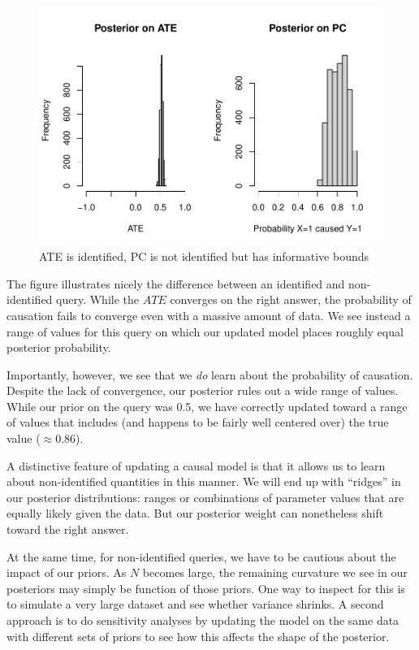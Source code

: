 \documentclass[
  12pt,
]{book}
\begin{document}
\begin{figure}

{\centering \includegraphics{ii_files/figure-latex/PChist-1} 

}

\caption{ATE is identified, PC is not identified but has informative bounds}\label{fig:PChist}
\end{figure}

The figure illustrates nicely the difference between an identified and non-identified query. While the \(ATE\) converges on the right answer, the probability of causation fails to converge even with a massive amount of data. We see instead a range of values for this query on which our updated model places roughly equal posterior probability.

Importantly, however, we see that we \emph{do} learn about the probability of causation. Despite the lack of convergence, our posterior rules out a wide range of values. While our prior on the query was 0.5, we have correctly updated toward a range of values that includes (and happens to be fairly well centered over) the true value (\(\approx 0.86\)).

A distinctive feature of updating a causal model is that it allows us to learn about non-identified quantities in this manner. We will end up with ``ridges'' in our posterior distributions: ranges or combinations of parameter values that are equally likely given the data. But our posterior weight can nonetheless shift toward the right answer.

At the same time, for non-identified queries, we have to be cautious about the impact of our priors. As \(N\) becomes large, the remaining curvature we see in our posteriors may simply be function of those priors. One way to inspect for this is to simulate a very large dataset and see whether variance shrinks. A second approach is to do sensitivity analyses by updating the model on the same data with different sets of priors to see how this affects the shape of the posterior.
\end{document}
